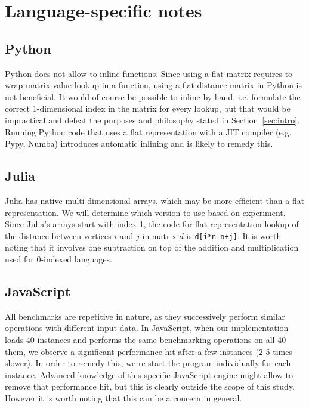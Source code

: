 \documentclass[11pt,a4paper,notitlepage]{article}
\begin{document}
\section{Language-specific notes}
\subsection{Python}
Python does not allow to inline functions. Since using a flat matrix
requires to wrap matrix value lookup in a function, using a flat distance
matrix in Python is not beneficial. It would of course be possible to
inline by hand, i.e. formulate the correct 1-dimensional index in the
matrix for every lookup, but that would be impractical and defeat the
purposes and philosophy stated in Section~\ref{sec:intro}.
Running Python code that uses a flat representation with a JIT compiler
(e.g. Pypy, Numba) introduces automatic inlining and is likely to
remedy this.
\subsection{Julia}
Julia has native multi-dimensional arrays, which may be more efficient
than a flat representation. We will determine which version to use
based on experiment. Since Julia's arrays start with index 1, the code
for flat representation lookup of the distance between vertices $i$
and $j$ in matrix $d$ is \lstinline{d[i*n-n+j]}. It is worth noting
that it involves one subtraction on top of the addition and
multiplication used for 0-indexed languages.
\subsection{JavaScript}
All benchmarks are repetitive in nature, as they successively perform similar
operations with different input data. In JavaScript, when our
implementation loads 40 instances and performs the same
benchmarking operations on all 40 them, we observe a significant performance
hit after a few instances (2-5 times slower). In order to remedy this,
we re-start the program individually for each instance. Advanced
knowledge of this specific JavaScript engine might allow to remove that
performance hit, but this is clearly outside the scope of this
study. However it is worth noting that this can be a concern in general.



\end{document}
